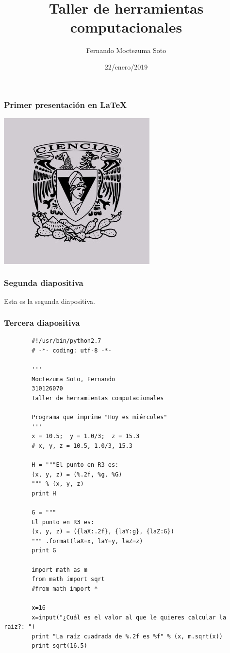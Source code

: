 \documentclass{beamer}
\title{Taller de herramientas computacionales}
\author{Fernando Moctezuma Soto}
\date{22/enero/2019}
\begin{document}
	
	\maketitle
	
	
	\begin{frame}
	\transblindshorizontal
		\frametitle{Primer presentación en LaTeX}
	\end{frame}


	\begin{center}
		\includegraphics[scale=0.50]{1.jpg}
	\end{center}

	\begin{frame}
		\frametitle{Segunda diapositiva}
		Esta es la segunda diapositiva.
	\end{frame}

	\begin{frame}[fragile]
		\frametitle{Tercera diapositiva}
		
		\begin{verbatim}
		#!/usr/bin/python2.7
		# -*- coding: utf-8 -*-
		
		'''
		Moctezuma Soto, Fernando
		310126070
		Taller de herramientas computacionales
		
		Programa que imprime "Hoy es miércoles"
		'''
		x = 10.5;  y = 1.0/3;  z = 15.3
		# x, y, z = 10.5, 1.0/3, 15.3
		
		H = """El punto en R3 es:
		(x, y, z) = (%.2f, %g, %G)
		""" % (x, y, z)
		print H
		
		G = """
		El punto en R3 es:
		(x, y, z) = ({laX:.2f}, {laY:g}, {laZ:G})
		""" .format(laX=x, laY=y, laZ=z)
		print G
		
		import math as m
		from math import sqrt 
		#from math import *
		
		x=16
		x=input("¿Cuál es el valor al que le quieres calcular la raiz?: ")
		print "La raíz cuadrada de %.2f es %f" % (x, m.sqrt(x))
		print sqrt(16.5)
		\end{verbatim}
		
	\end{frame}
		
\end{document}
